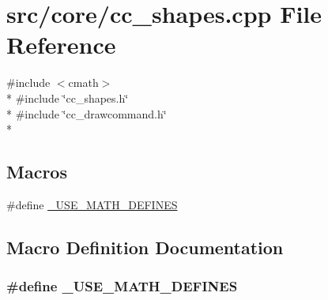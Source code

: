 \hypertarget{a00209}{\section{src/core/cc\-\_\-shapes.cpp File Reference}
\label{a00209}
}
{\ttfamily \#include $<$cmath$>$}\\*
{\ttfamily \#include \char`\"{}cc\-\_\-shapes.\-h\char`\"{}}\\*
{\ttfamily \#include \char`\"{}cc\-\_\-drawcommand.\-h\char`\"{}}\\*
\subsection*{Macros}
\begin{DoxyCompactItemize}
\item 
\#define \hyperlink{a00209_a525335710b53cb064ca56b936120431e}{\-\_\-\-U\-S\-E\-\_\-\-M\-A\-T\-H\-\_\-\-D\-E\-F\-I\-N\-E\-S}
\end{DoxyCompactItemize}


\subsection{Macro Definition Documentation}
\hypertarget{a00209_a525335710b53cb064ca56b936120431e}{
\subsubsection[{\-\_\-\-U\-S\-E\-\_\-\-M\-A\-T\-H\-\_\-\-D\-E\-F\-I\-N\-E\-S}]{\setlength{\rightskip}{0pt plus 5cm}\#define \-\_\-\-U\-S\-E\-\_\-\-M\-A\-T\-H\-\_\-\-D\-E\-F\-I\-N\-E\-S}}\label{a00209_a525335710b53cb064ca56b936120431e}
